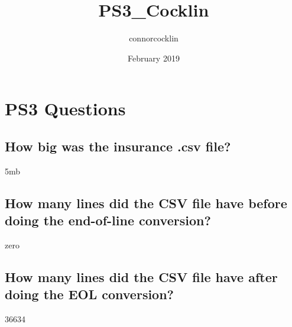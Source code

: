 \documentclass{article}
\title{PS3_Cocklin}
\author{connorcocklin }
\date{February 2019}
\begin{document}
\maketitle

\section{PS3 Questions}
\subsection{How big was the insurance .csv file?}
  \centerline{5mb}
\subsection{How many lines did the CSV file have before doing the end-of-line conversion?}
  \centerline{zero} 
\subsection{How many lines did the CSV file have after doing the EOL conversion?}
  \centerline{36634} 
\end{document}
